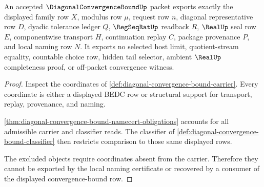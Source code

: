 \begin{theorem}
\label{thm:diagonal-convergence-bound-nonchoice-boundary}
An accepted $\DiagonalConvergenceBoundUp$ packet exports exactly the displayed family row $X$, modulus row $\mu$, request row $n$, diagonal representative row $D$, dyadic tolerance ledger $Q$, $\RegSeqRatUp$ readback $R$, $\RealUp$ seal row $E$, componentwise transport $H$, continuation replay $C$, package provenance $P$, and local naming row $N$. It exports no selected host limit, quotient-stream equality, countable choice row, hidden tail selector, ambient $\RealUp$ completeness proof, or off-packet convergence witness.
\end{theorem}
\begin{proof}
Inspect the coordinates of \autoref{def:diagonal-convergence-bound-carrier}. Every coordinate is either a displayed BEDC row or structural support for transport, replay, provenance, and naming.

\autoref{thm:diagonal-convergence-bound-namecert-obligations} accounts for all admissible carrier and classifier reads. The classifier of \autoref{def:diagonal-convergence-bound-classifier} then restricts comparison to those same displayed rows.

The excluded objects require coordinates absent from the carrier. Therefore they cannot be exported by the local naming certificate or recovered by a consumer of the displayed convergence-bound row.
\end{proof}

